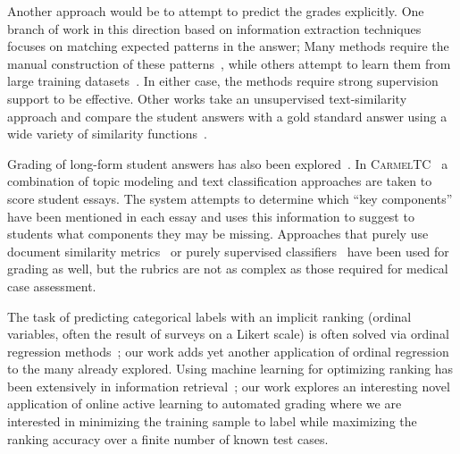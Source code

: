 Another approach would be to attempt to predict the grades explicitly. One
branch of work in this direction based on information extraction techniques
focuses on matching expected patterns in the answer;
 Many methods require the manual construction of these
patterns~\cite{Mitchell:2002:ICAA, Leacock:2003:CatH}, while others attempt to
learn them from large training datasets~\cite{Pulman:2005:EdAppsNLP}. In either
case, the methods require strong supervision support to be effective.  Other
works take an unsupervised text-similarity approach and compare the student
answers with a gold standard answer using a wide variety of similarity
functions~\cite{Mohler:2009:EACL}.

Grading of long-form student answers has also been
explored~\cite{Balfour:2013}. In
\textsc{CarmelTC}~\cite{Rose:2003:HLT-NAACL-EDUC} a combination of topic
modeling and text classification approaches are taken to score student
essays. The system attempts to determine which ``key components'' have been
mentioned in each essay and uses this information to suggest to students
what components they may be missing. Approaches that purely use document
similarity metrics~\cite{Duwairi:2006:CHB} or purely supervised
classifiers~\cite{Larkey:1998:SIGIR} have been used for grading as well,
but the rubrics are not as complex as those required for medical case
assessment.

The task of predicting categorical labels with an implicit ranking (ordinal
variables, often the result of surveys on a Likert scale) is often solved
via ordinal regression methods~\cite{McCullagh:1980}; our work
adds yet another application of ordinal regression to the
many 
 already explored. Using machine learning for optimizing
ranking has been extensively in information retrieval~\cite{Manning:2008}; our
work explores an interesting novel application of online active learning to
automated grading where we are interested in minimizing the training sample
to label while maximizing the ranking accuracy over a finite number of
known test cases.
